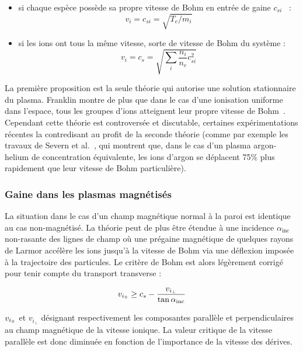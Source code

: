 \begin{refsection}
\begin{itemize}
  \item si chaque espèce possède sa
propre vitesse de Bohm en entrée de gaine $c_{si}$~\parencite{Allen} :
\begin{equation}
\label{1-BohmSpeed1}
v_i=c_{si}=\sqrt{T_e/m_i}
\end{equation}
	\item si les ions ont tous la même vitesse, sorte de vitesse de Bohm du système
	:
	\begin{equation}
\label{1-BohmSpeed2}
v_i=c_s=\sqrt{\sum_i\frac{n_i}{n_e}c_{si}^2}
\end{equation}
 \end{itemize}

La première proposition est la seule théorie
qui autorise une solution stationnaire du plasma. Franklin
montre de plus que dans le cas d'une ionisation uniforme dans l'espace, tous les groupes
d'ions atteignent leur propre vitesse de Bohm~\parencite{Franklin}. Cependant
cette théorie est controversée et discutable, certaines expérimentations
récentes la contredisant au profit de la seconde théorie (comme par exemple les travaux de
Severn et al.~\parencite{Severn}, qui montrent que, dans le cas d'un plasma
argon-helium de concentration équivalente, les ions d'argon se déplacent 75\%
plus rapidement que leur vitesse de Bohm particulière).

\subsubsection{Gaine dans les plasmas magnétisés}
La situation dans le cas d'un champ magnétique normal à la paroi est
identique au cas non-magnétisé. La théorie peut de plus être étendue 
à une incidence $\alpha_\text{inc}$ non-rasante des lignes de champ où une
prégaine magnétique de quelques rayons de Larmor accélère les ions jusqu'à la
vitesse de Bohm via une déflexion imposée à la trajectoire des particules. Le
critère de Bohm est alors légèrement corrigé pour tenir compte du transport transverse
\cite{Stangeby} :

\begin{equation}
	v_{i_{\para}}\geq
	c_{s}-\frac{v_{i_{\perp}}}{\tan{\alpha_\text{inc}}}
\end{equation}
 
 $v_{i_{\para}}$ et $v_{i_{\perp}}$ désignant respectivement les composantes
 parallèle et perpendiculaires au champ magnétique de la vitesse ionique. La valeur critique
 de la vitesse parallèle est donc diminuée en fonction de l'importance de la
 vitesse des dérives.
 

\end{refsection}
